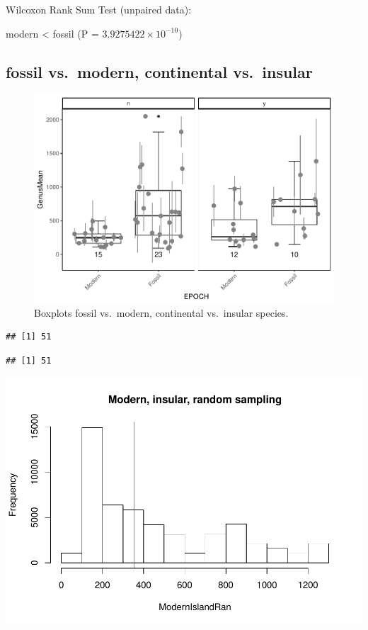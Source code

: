 \documentclass[]{article}
\begin{document}
Wilcoxon Rank Sum Test (unpaired data):

modern \textless{} fossil (P = \(3.9275422\times 10^{-10}\))

\newpage

\subsection{fossil vs.~modern, continental
vs.~insular}\label{fossil-vs.modern-continental-vs.insular}

\begin{figure}[htbp]
\centering
\includegraphics{MA_JJ_files/figure-latex/BPFMCI-1.pdf}
\caption{Boxplots fossil vs.~modern, continental vs.~insular species.}
\end{figure}

\begin{verbatim}
## [1] 51
\end{verbatim}

\begin{verbatim}
## [1] 51
\end{verbatim}

\includegraphics{MA_JJ_files/figure-latex/RSMFCI-1.pdf}
\end{document}
